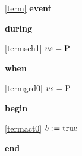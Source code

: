 \noindent \ref{term}  \textbf{event}
\begin{block}
  \item   \textbf{during}
  \begin{block}
  \item[ \eqref{termsch1} ]$vs = \text{P}$ %
  \end{block}
  \item   \textbf{when}
  \begin{block}
  \item[ \eqref{termgrd0} ]$vs = \text{P}$ %
  \end{block}
  \item   \textbf{begin}
  \begin{block}
  \item[ \eqref{termact0} ]$b \mathrel{:\mkern1mu=} \text{true} $ %
  \end{block}
  \item   \textbf{end} \\
\end{block}
